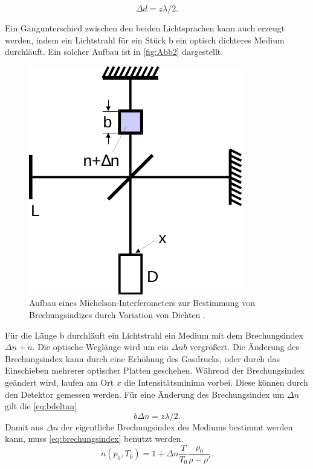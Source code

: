 \begin{equation}
    \Delta d = z \lambda/2. 
    \label{eq:deltad}
\end{equation}

Ein Gangunterschied zwischen den beiden Lichtsprachen kann auch erzeugt werden, indem ein Lichtstrahl für ein Stück b ein optisch dichteres Medium durchläuft.
Ein solcher Aufbau ist in \autoref{fig:Abb2} dargestellt.
\begin{figure}[H]
    \centering
    \includegraphics{figures/Abb2.pdf}
    \caption{Aufbau eines Michelson-Interferometers zur Bestimmung von Brechungsindizes durch Variation von Dichten \cite{ap11}.}
    \label{fig:Abb2}
\end{figure}

Für die Länge b durchläuft ein Lichtstrahl ein Medium mit dem Brechungsindex $ \Delta n + n$. Die optische Weglänge wird um ein $\Delta n b$ vergrößert.
Die Änderung des Brechungsindex kann durch eine Erhöhung des Gasdrucks, oder durch das Einschieben mehrerer optischer Platten geschehen.
Während der Brechungsindex geändert wird, laufen am Ort $x$ die Intensitätsminima vorbei. Diese können durch den Detektor gemessen werden.
Für eine Änderung des Brechungsindex um $\Delta n$ gilt die \eqref{eq:bdeltan}
\begin{equation}
    b \Delta n = z λ/2. 
    \label{eq:bdeltan}
\end{equation}
Damit aus $\Delta n$ der eigentliche Brechungsindex des Mediums bestimmt werden kann, muss \eqref{eq:brechungsindex} benutzt werden.
\begin{equation}
    n(p_0,T_0) = 1 + \Delta n \frac{T}{T_0} \frac{\rho_0}{\rho - \rho'} .
    \label{eq:brechungsindex}
\end{equation}

